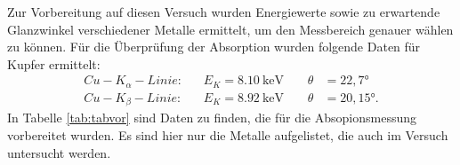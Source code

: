 Zur Vorbereitung auf diesen Versuch wurden Energiewerte sowie zu erwartende Glanzwinkel verschiedener
Metalle ermittelt, um den Messbereich genauer wählen zu können.
Für die Überprüfung der Absorption wurden folgende Daten für Kupfer ermittelt:
\begin{align*}
  Cu-K_{\alpha}-Linie:& \;\;\;E_K=\SI{8,10}{\keV}\;\;\;\;&\theta &=22,7°\\
  Cu-K_{\beta}-Linie:& \;\;\;E_K=\SI{8,92}{\keV}\;\;\;\;&\theta &=20,15°.
\end{align*}
In Tabelle \ref{tab:tabvor} sind Daten zu finden, die für die Absopionsmessung
vorbereitet wurden. Es sind hier nur die Metalle aufgelistet, die auch im Versuch
untersucht werden.

